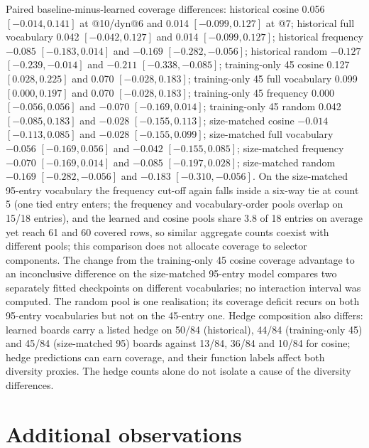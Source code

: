 Paired baseline-minus-learned coverage differences: historical cosine 0.056 $[-0.014,0.141]$ at @10/dyn@6 and 0.014 $[-0.099,0.127]$ at @7; historical full vocabulary 0.042 $[-0.042,0.127]$ and 0.014 $[-0.099,0.127]$; historical frequency $-0.085$ $[-0.183,0.014]$ and $-0.169$ $[-0.282,-0.056]$; historical random $-0.127$ $[-0.239,-0.014]$ and $-0.211$ $[-0.338,-0.085]$; training-only 45 cosine 0.127 $[0.028,0.225]$ and 0.070 $[-0.028,0.183]$; training-only 45 full vocabulary 0.099 $[0.000,0.197]$ and 0.070 $[-0.028,0.183]$; training-only 45 frequency 0.000 $[-0.056,0.056]$ and $-0.070$ $[-0.169,0.014]$; training-only 45 random 0.042 $[-0.085,0.183]$ and $-0.028$ $[-0.155,0.113]$; %
size-matched cosine $-0.014$ $[-0.113,0.085]$ and $-0.028$ $[-0.155,0.099]$; size-matched full vocabulary $-0.056$ $[-0.169,0.056]$ and $-0.042$ $[-0.155,0.085]$; size-matched frequency $-0.070$ $[-0.169,0.014]$ and $-0.085$ $[-0.197,0.028]$; size-matched random $-0.169$ $[-0.282,-0.056]$ and $-0.183$ $[-0.310,-0.056]$. On the size-matched 95-entry vocabulary the frequency cut-off again falls inside a six-way tie at count 5 (one tied entry enters; the frequency and vocabulary-order pools overlap on 15/18 entries), and the learned and cosine pools share 3.8 of 18 entries on average yet reach 61 and 60 covered rows, so similar aggregate counts coexist with different pools; this comparison does not allocate coverage to selector components. The change from the training-only 45 cosine coverage advantage to an inconclusive difference on the size-matched 95-entry model compares two separately fitted checkpoints on different vocabularies; no interaction interval was computed. %
The random pool is one realisation; its coverage deficit recurs on both 95-entry vocabularies but not on the 45-entry one. Hedge composition also differs: learned boards carry a listed hedge on 50/84 (historical), 44/84 (training-only 45) and 45/84 (size-matched 95) boards against 13/84, 36/84 and 10/84 for cosine; hedge predictions can earn coverage, and their function labels affect both diversity proxies. The hedge counts alone do not isolate a cause of the diversity differences. %

\section{Additional observations}\label{app:additional}

